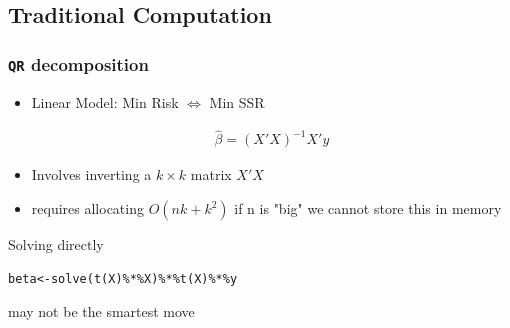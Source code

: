 \documentclass[
  shownotes,
  xcolor={svgnames},
  hyperref={colorlinks,citecolor=DarkBlue,linkcolor=DarkRed,urlcolor=DarkBlue}
  , aspectratio=169]{beamer}
\newenvironment{Shaded}{\begin{snugshade}}{\end{snugshade}}
\begin{document}
\subsection{Traditional Computation}
\begin{frame}[fragile]
\frametitle{\texttt{QR} decomposition}

\begin{itemize}
\item Linear Model: Min Risk $\iff$ Min SSR

\begin{align}
\hat \beta=(X'X)^{-1}X'y
\end{align}

\item Involves inverting a $k\times k$ matrix $X'X$
\item requires allocating $O (nk+k^2)$ if n is "big" we cannot store this in memory

\end{itemize}

Solving directly


\begin{Shaded}
\begin{verbatim}
beta<-solve(t(X)%*%X)%*%t(X)%*%y
\end{verbatim}
\end{Shaded}


may not be the smartest move

    
  
\end{frame}
\end{document}
